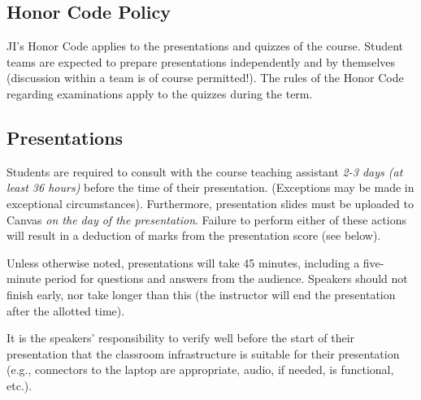 \documentclass[12pt]{article}
\begin{document}
\subsection*{Honor Code Policy}
JI's Honor Code applies to the presentations and quizzes of the course. Student teams are expected to prepare presentations independently and by themselves (discussion within a team is of course permitted!). The rules of the Honor Code regarding examinations apply to the quizzes during the term.

\subsection*{Presentations}
Students are required to consult with the course teaching assistant \textit{2-3 days (at least 36 hours)} before the time of their presentation. (Exceptions may be made in exceptional circumstances). Furthermore, presentation slides must be uploaded to Canvas \textit{on the day of the presentation}.  Failure to perform either of these actions will result in a deduction of marks from the presentation score (see below). 

Unless otherwise noted, presentations will take 45 minutes, including a five-minute period for questions and answers from the audience. Speakers should not finish early, nor take longer than this (the instructor will end the presentation after the allotted time).

It is the speakers' responsibility to verify well before the start of their presentation that the classroom infrastructure is suitable for their presentation (e.g., connectors to the laptop are appropriate, audio, if needed, is functional, etc.).
\end{document}
